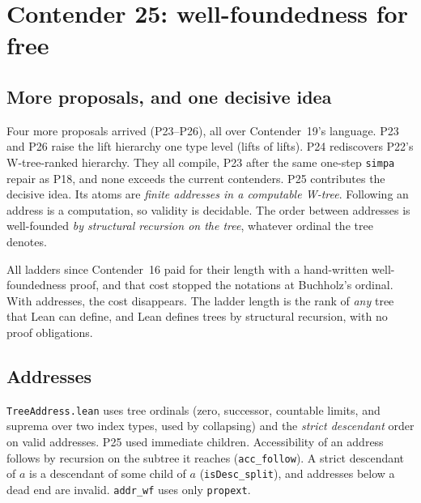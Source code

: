 \documentclass[11pt]{article}
\theoremstyle{definition}
\theoremstyle{remark}
\newcommand{\lean}[1]{\texttt{#1}}
\begin{document}
\section{Contender 25: well-foundedness for free}

\subsection{More proposals, and one decisive idea}
Four more proposals arrived (P23--P26), all over Contender~19's language. P23
and P26 raise the lift hierarchy one type level (lifts of lifts). P24
rediscovers P22's W-tree-ranked hierarchy. They all compile, P23 after the
same one-step \lean{simpa} repair as P18, and none exceeds the current
contenders. P25 contributes the decisive idea. Its atoms are \emph{finite
addresses in a computable W-tree}. Following an address is a computation, so
validity is decidable. The order between addresses is well-founded \emph{by
structural recursion on the tree}, whatever ordinal the tree denotes.

All ladders since Contender~16 paid for their length with a hand-written
well-foundedness proof, and that cost stopped the notations at Buchholz's
ordinal. With addresses, the cost disappears. The ladder length is the rank of
\emph{any} tree that Lean can define, and Lean defines trees by structural
recursion, with no proof obligations.

\subsection{Addresses}
\lean{TreeAddress.lean} uses tree ordinals (zero, successor, countable limits,
and suprema over two index types, used by collapsing) and the \emph{strict
descendant} order on valid addresses. P25 used immediate children. Accessibility
of an address follows by recursion on the subtree it reaches
(\lean{acc\_follow}). A strict descendant of $a$ is a descendant of some child
of $a$ (\lean{isDesc\_split}), and addresses below a dead end are invalid.
\lean{addr\_wf} uses only \lean{propext}.
\end{document}
